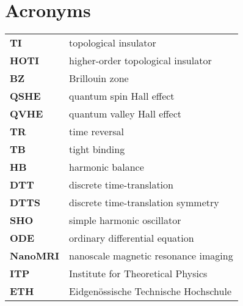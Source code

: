 
\chapter*{Acronyms}

\begin{tabularx}{\textwidth}{>{\bfseries}lX}
TI	&	topological insulator \\
HOTI & higher-order topological insulator \\
BZ	&	Brillouin zone \\
QSHE & quantum spin Hall effect \\
QVHE	& quantum valley Hall effect \\
TR  &	time reversal \\
TB	&	tight binding \\
HB 			& harmonic balance \\
DTT			& discrete time-translation \\
DTTS		& discrete time-translation symmetry \\
SHO			& simple harmonic oscillator \\
ODE				& ordinary differential equation \\
NanoMRI	& nanoscale magnetic resonance imaging \\
ITP 			& Institute for Theoretical Physics \\
ETH 			& Eidgenössische Technische Hochschule \\
\end{tabularx}